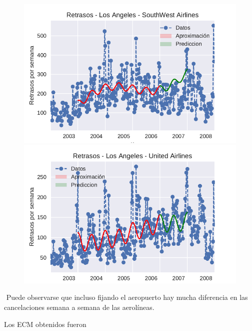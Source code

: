 \begin{figure}[H]
\centering
\begin{minipage}{.5\textwidth}
  \centering
  \includegraphics[width=1.1\linewidth]{informe/imagenes/retrasosSouthWestLA.pdf}
\end{minipage}%
\begin{minipage}{.5\textwidth}
  \centering
    \includegraphics[width=1.1\linewidth]{informe/imagenes/retrasosUnitedAirlinesLA.pdf}
\end{minipage}
\end{figure}

$ $\newline
Puede observarse que incluso fijando el aeropuerto hay mucha diferencia en las cancelaciones semana a semana de las aerolíneas.

Los ECM obtenidos fueron 


